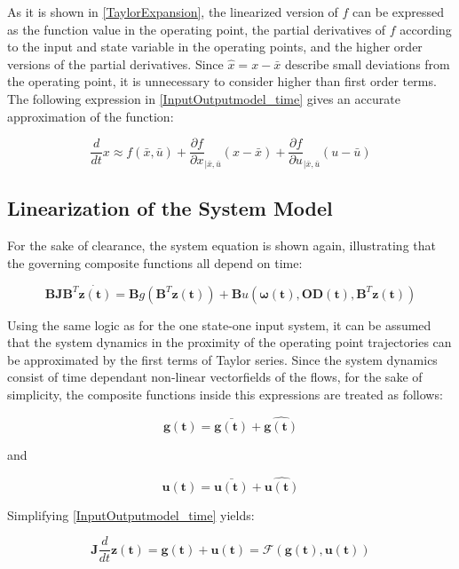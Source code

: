 As it is shown in \eqref{TaylorExpansion}, the linearized version of $f$ can be expressed as the function value in the operating point, the partial derivatives of $f$ according to the input and state variable in the operating points, and the higher order versions of the partial derivatives. Since $\hat{x} = x - \bar{x}$ describe small deviations from the operating point, it is unnecessary to consider higher than first order terms. The following expression in \eqref{InputOutputmodel_time} gives an accurate approximation of the function: 

\begin{equation}
\frac{d}{dt} x \approx f(\bar{x},\bar{u}) + \frac{\partial f}{\partial x}_{|\bar{x}, \bar{u}} (x-\bar{x}) + \frac{\partial f}{\partial u}_{|\bar{x}, \bar{u}} (u-\bar{u}) 
 \label{TaylorExpansion_approx}
\end{equation}

\subsection{Linearization of the System Model}
 \label{SystemLin}
 
For the sake of clearance, the system equation is shown again, illustrating that the governing composite functions all depend on time: 

\begin{equation}
 \pmb{B}\pmb{J {B}}^T \pmb{\dot{z(t)}} = \pmb{B} g(\pmb{B}^T \pmb{z(t)})+ \pmb{B} u(\pmb{\omega(t)},\pmb{OD(t)}, \pmb{B}^T \pmb{z(t)})
 \label{InputOutputmodel_time}
\end{equation}

Using the same logic as for the one state-one input system, it can be assumed that the system dynamics in the proximity of the operating point trajectories can be approximated by the first terms of Taylor series. Since the system dynamics consist of time dependant non-linear vectorfields of the flows, for the sake of simplicity, the composite functions inside this expressions are treated as follows: 

\begin{equation}
\pmb{g(t)} = \pmb{\bar{g(t)}} + \pmb{\hat{g(t)}}
 \label{gfunc}
\end{equation}

and

\begin{equation}
\pmb{u(t)} = \pmb{\bar{u(t)}} + \pmb{\hat{u(t)}}
 \label{ufunc}
\end{equation}

Simplifying \eqref{InputOutputmodel_time} yields: 

\begin{equation}
\pmb{J} \frac{d}{dt} \pmb{z(t)} = \pmb{g(t)} + \pmb{u(t)} = \mathcal{F}(\pmb{g(t)},\pmb{u(t)} )
 \label{sysfunc_simplified}
\end{equation}